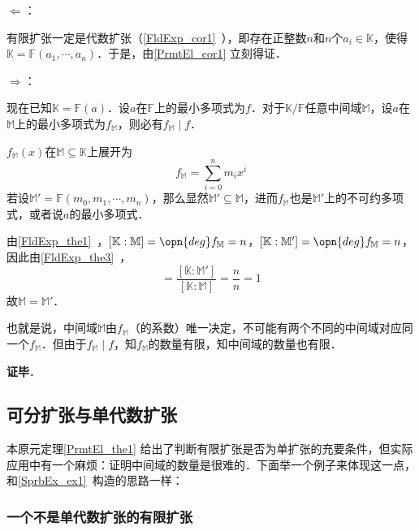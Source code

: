 $\Leftarrow$：

有限扩张一定是代数扩张（\autoref{FldExp_cor1}~），即存在正整数$n$和$n$个$a_i\in\mathbb{K}$，使得$\mathbb{K}=\mathbb{F}(a_1, \cdots, a_n)$．于是，由\autoref{PrmtEl_cor1} 立刻得证．

$\Rightarrow$：

现在已知$\mathbb{K}=\mathbb{F}(a)$．设$a$在$\mathbb{F}$上的最小多项式为$f$．对于$\mathbb{K}/\mathbb{F}$任意中间域$\mathbb{M}$，设$a$在$\mathbb{M}$上的最小多项式为$f_\mathbb{M}$，则必有$f_{\mathbb{M}}\mid f$．

$f_\mathbb{M}(x)$在$\mathbb{M}\subseteq\mathbb{K}$上展开为
\begin{equation}
f_\mathbb{M} = \sum_{i=0}^n m_ix^i
\end{equation}
若设$\mathbb{M}'=\mathbb{F}(m_0, m_1, \cdots, m_n)$，那么显然$\mathbb{M}'\subseteq\mathbb{M}$，进而$f_\mathbb{M}$也是$\mathbb{M}'$上的不可约多项式，或者说$a$的最小多项式．

由\autoref{FldExp_the1}~，$[\mathbb{K}:\mathbb{M}]=\opn{deg}f_\mathbb{M}=n$，$[\mathbb{K}:\mathbb{M}']=\opn{deg}f_\mathbb{M}=n$，因此由\autoref{FldExp_the3}~，
\begin{equation}
[\mathbb{M}:\mathbb{M}']=\frac{[\mathbb{K}:\mathbb{M}']}{[\mathbb{K}:\mathbb{M}]}=\frac{n}{n}=1
\end{equation}
故$\mathbb{M}=\mathbb{M}'$．

也就是说，中间域$\mathbb{M}$由$f_\mathbb{M}$（的系数）唯一决定，不可能有两个不同的中间域对应同一个$f_{\mathbb{M}}$．但由于$f_\mathbb{M}\mid f$，知$f_\mathbb{M}$的数量有限，知中间域的数量也有限．

\textbf{证毕}．


\subsection{可分扩张与单代数扩张}


本原元定理\autoref{PrmtEl_the1} 给出了判断有限扩张是否为单扩张的充要条件，但实际应用中有一个麻烦：证明中间域的数量是很难的．下面举一个例子来体现这一点，和\autoref{SprbEx_ex1}~构造的思路一样：

\subsubsection{一个不是单代数扩张的有限扩张}

